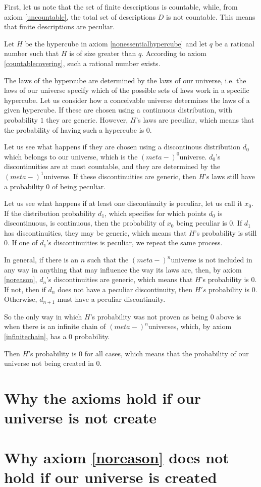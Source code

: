 \documentclass[a4paper
,draft
]{article}
\begin{document}
First, let us note that the set of finite descriptions is countable, while, from axiom \ref{uncountable}, the total set of descriptions $D$ is not countable. This means that finite descriptions are peculiar.

Let $H$ be the hypercube in axiom \ref{nonessentialhypercube} and let $q$ be a rational number such that $H$ is of size greater than $q$. According to axiom \ref{countablecovering}, such a rational number exists.

The laws of the hypercube are determined by the laws of our universe, i.e. the laws of our universe specify which of the possible sets of laws work in a specific hypercube. Let us consider how a conceivable universe determines the laws of a given hypercube. If these are chosen using a continuous distribution, with probability $1$ they are generic. However, $H$'s laws are peculiar, which means that the probability of having such a hypercube is $0$.

Let us see what happens if they are chosen using a discontinous distribution $d_0$ which belongs to our universe, which is the $(meta-)^0$universe. $d_0$'s discontinuities are at most countable, and they are determined by the $(meta-)^1$universe. If these discontinuities are generic, then $H$'s laws still have a probability $0$ of being peculiar.

Let us see what happens if at least one discontinuity is peculiar, let us call it $x_0$. If the distribution probability $d_1$, which specifies for which points $d_0$ is discontinuous, is continuous, then the probability of $x_0$ being peculiar is $0$. If $d_1$ has discontinuities, they may be generic, which means that $H$'s probability is still $0$. If one of $d_1$'s discontinuities is peculiar, we repeat the same process.

In general, if there is an $n$ such that the $(meta-)^{n}$universe is not included in any way in anything that may influence the way its laws are, then, by axiom \ref{noreason}, $d_n$'s discontinuities are generic, which means that $H$'s probability is $0$. If not, then if $d_n$ does not have a peculiar discontinuity, then $H's$ probability is $0$. Otherwise, $d_{n+1}$ must have a peculiar discontinuity.

So the only way in which $H$'s probability was not proven as being $0$ above is when there is an infinite chain of $(meta-)^{n}$universes, which, by axiom \ref{infinitechain}, has a $0$ probability.

Then $H$'s probability is $0$ for all cases, which means that the probability of our universe not being created in $0$.

\section{Why the axioms hold if our universe is not create}

\section{Why axiom \ref{noreason} does not hold if our universe is created}
\end{document}
